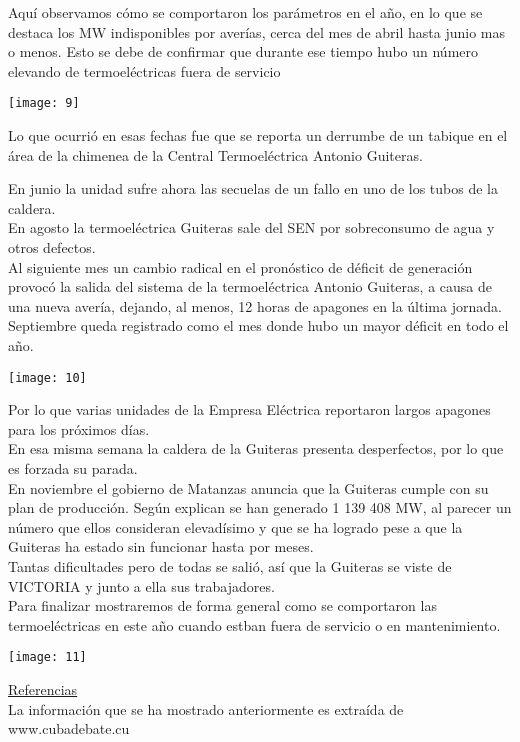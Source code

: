 \documentclass{article}
\begin{document}
\vspace{1cm}

Aquí observamos cómo se comportaron los parámetros en el año, en lo que se destaca los MW indisponibles por averías, cerca del mes de abril hasta junio mas o menos. Esto se debe de confirmar que durante ese tiempo hubo un número elevando de termoeléctricas fuera de servicio\\

\vspace{0.5cm}
\begin{center}
   \texttt{[image: 9]}\\ 
\end{center}

\vspace{0.5cm}

Lo que ocurrió en esas fechas fue que se reporta un derrumbe de un tabique en el área de la chimenea de la Central Termoeléctrica Antonio Guiteras.\\

\vspace{0.5cm}

En junio la unidad sufre ahora las secuelas de un fallo en uno de los tubos de la caldera.\\
En agosto la termoeléctrica Guiteras sale del SEN por sobreconsumo de agua y otros defectos.\\
Al siguiente mes un cambio radical en el pronóstico de déficit de generación provocó la salida del sistema de la termoeléctrica Antonio Guiteras, a causa de una nueva avería, dejando, al menos, 12 horas de apagones en la última jornada. Septiembre queda registrado como el mes donde hubo un mayor déficit en todo el año.\\

\vspace{0.5cm}
\begin{center}
    \texttt{[image: 10]}
\end{center}

\vspace{0.5cm}

Por lo que varias unidades de la Empresa Eléctrica reportaron largos apagones para los próximos días.\\
En esa misma semana la caldera de la Guiteras presenta desperfectos, por lo que es forzada su parada. \\
En noviembre el gobierno de Matanzas anuncia que la Guiteras cumple con su plan de producción. Según explican se han generado 1 139 408 MW, al parecer un número que ellos consideran elevadísimo y que se ha logrado pese a que la Guiteras ha estado sin funcionar hasta por meses.\\
Tantas dificultades pero de todas se salió, así que la Guiteras se viste de VICTORIA y junto a ella sus trabajadores.\\
Para finalizar mostraremos de forma general como se comportaron las termoeléctricas en este año cuando estban fuera de servicio o en mantenimiento.\\

\vspace{0.5cm}
\begin{center}
    \texttt{[image: 11]}
\end{center}
\vspace{1cm}
\underline{Referencias}\\

La información que se ha mostrado anteriormente es extraída de www.cubadebate.cu
\end{document}
